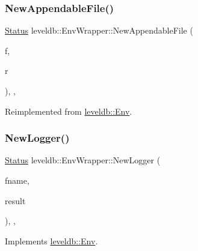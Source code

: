 \subsubsection{\texorpdfstring{NewAppendableFile()}{NewAppendableFile()}}
{\footnotesize\ttfamily \mbox{\hyperlink{classleveldb_1_1_status}{Status}} leveldb\+::\+Env\+Wrapper\+::\+New\+Appendable\+File (\begin{DoxyParamCaption}\item[{const std\+::string \&}]{f,  }\item[{\mbox{\hyperlink{classleveldb_1_1_writable_file}{Writable\+File}} $\ast$$\ast$}]{r }\end{DoxyParamCaption})\hspace{0.3cm}{\ttfamily [inline]}, {\ttfamily [override]}, {\ttfamily [virtual]}}



Reimplemented from \mbox{\hyperlink{classleveldb_1_1_env_a77886b6f8f8b5df8e40057be234a3b5d}{leveldb\+::\+Env}}.

\mbox{\label{classleveldb_1_1_env_wrapper_a5782db35fbf6e1a449b64f3aa43e174d}} 
\subsubsection{\texorpdfstring{NewLogger()}{NewLogger()}}
{\footnotesize\ttfamily \mbox{\hyperlink{classleveldb_1_1_status}{Status}} leveldb\+::\+Env\+Wrapper\+::\+New\+Logger (\begin{DoxyParamCaption}\item[{const std\+::string \&}]{fname,  }\item[{\mbox{\hyperlink{classleveldb_1_1_logger}{Logger}} $\ast$$\ast$}]{result }\end{DoxyParamCaption})\hspace{0.3cm}{\ttfamily [inline]}, {\ttfamily [override]}, {\ttfamily [virtual]}}



Implements \mbox{\hyperlink{classleveldb_1_1_env_a53a4c41d294fe619f13ec5b697ffc933}{leveldb\+::\+Env}}.

\mbox{\label{classleveldb_1_1_env_wrapper_ac1143b03917d33af0a946862f6a452fc}} 

